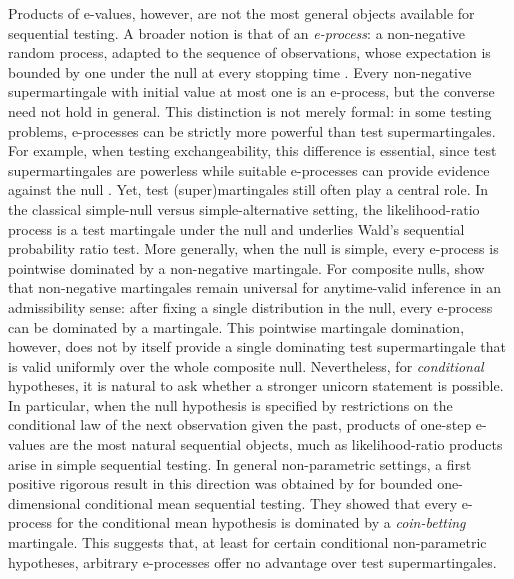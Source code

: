 \documentclass[10pt, a4paper]{article}
\begin{document}
Products of e-values, however, are not the most general objects available for sequential testing. A broader notion is that of an \emph{e-process}: a non-negative random process, adapted to the sequence of observations, whose expectation is bounded by one under the null at every stopping time \citep{shafer2021testing}. Every non-negative supermartingale with initial value at most one is an e-process, but the converse need not hold in general.  This distinction is not merely formal: in some testing problems, e-processes can be strictly more powerful than test supermartingales. For example, when testing exchangeability, this difference is essential, since test supermartingales are powerless while suitable e-processes can  provide evidence against the null \citep{ramdas22testing}. Yet, test (super)martingales still often play a central role. In the classical simple-null versus simple-alternative setting, the likelihood-ratio process is a test martingale under the null and underlies Wald's sequential probability ratio test. More generally, when the null is simple, every e-process is pointwise dominated by a non-negative martingale. For composite nulls, \citet{ramdas2020admissible} show that non-negative martingales remain universal for anytime-valid inference in an admissibility sense: after fixing a single distribution in the null, every e-process can be dominated by a martingale. This pointwise martingale domination, however, does not by itself provide a single  dominating test supermartingale that is valid uniformly over the whole composite null. Nevertheless, for \emph{conditional} hypotheses, it is natural to ask whether a stronger unicorn statement is possible. In particular, when the null hypothesis is specified by restrictions on the conditional law of the next observation given the past, products of one-step e-values are the most natural sequential objects, much as likelihood-ratio products arise in simple sequential testing. In general non-parametric settings, a first positive rigorous result in this direction was obtained by \citet{clerico2025optimality} for bounded one-dimensional conditional mean sequential testing. They showed that every e-process for the conditional mean hypothesis is dominated by a \emph{coin-betting} martingale. This suggests that, at least for certain conditional non-parametric hypotheses, arbitrary e-processes offer no advantage over test supermartingales. 
\end{document}
